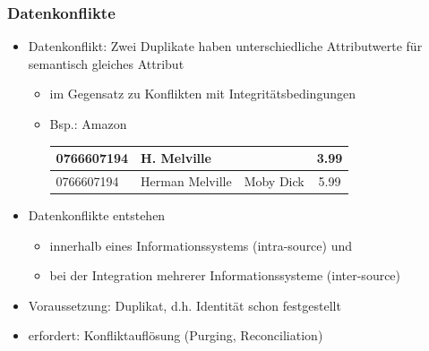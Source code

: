     \begin{frame}
    \frametitle{Datenkonflikte}
    
    \begin{itemize}
    \item Datenkonflikt: Zwei Duplikate haben unterschiedliche
      Attributwerte für semantisch gleiches Attribut
    \begin{itemize}
    \item im Gegensatz zu Konflikten mit Integritätsbedingungen
    \item Bsp.: Amazon\\
    \begin{tabular}{|l|l|l|c|}
    \hline
    0766607194 & H. Melville & & 3.99 \\
    \hline
    0766607194 & Herman Melville &  Moby Dick & 5.99 \\
    \hline
    \end{tabular}
    
    \end{itemize}
    
    \item Datenkonflikte entstehen 
    \begin{itemize}
    \item innerhalb eines Informationssystems (intra-source) und
    \item bei der Integration mehrerer Informationssysteme (inter-source)
    \end{itemize}
    \item Voraussetzung: Duplikat, d.h. Identität schon festgestellt
    \item erfordert: Konfliktauflösung (Purging, Reconciliation)
    \end{itemize}
    
    \end{frame}
    
    
